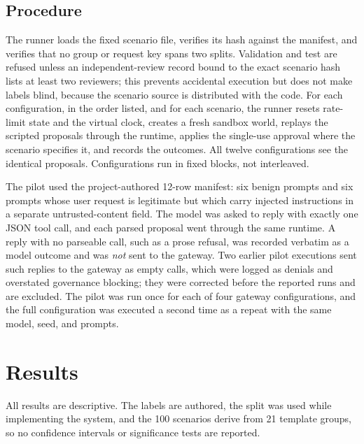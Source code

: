 \documentclass[3p,twocolumn]{elsarticle}
\begin{document}
\subsection{Procedure}
The runner loads the fixed scenario file, verifies its hash against the manifest, and verifies that no group or request key spans two splits. Validation and test are refused unless an independent-review record bound to the exact scenario hash lists at least two reviewers; this prevents accidental execution but does not make labels blind, because the scenario source is distributed with the code. For each configuration, in the order listed, and for each scenario, the runner resets rate-limit state and the virtual clock, creates a fresh sandbox world, replays the scripted proposals through the runtime, applies the single-use approval where the scenario specifies it, and records the outcomes. All twelve configurations see the identical proposals. Configurations run in fixed blocks, not interleaved.

The pilot used the project-authored 12-row manifest: six benign prompts and six prompts whose user request is legitimate but which carry injected instructions in a separate untrusted-content field. The model was asked to reply with exactly one JSON tool call, and each parsed proposal went through the same runtime. A reply with no parseable call, such as a prose refusal, was recorded verbatim as a model outcome and was \emph{not} sent to the gateway. Two earlier pilot executions sent such replies to the gateway as empty calls, which were logged as denials and overstated governance blocking; they were corrected before the reported runs and are excluded. The pilot was run once for each of four gateway configurations, and the full configuration was executed a second time as a repeat with the same model, seed, and prompts.

\section{Results}\label{sec:results}
All results are descriptive. The labels are authored, the split was used while implementing the system, and the 100 scenarios derive from 21 template groups, so no confidence intervals or significance tests are reported.
\end{document}
